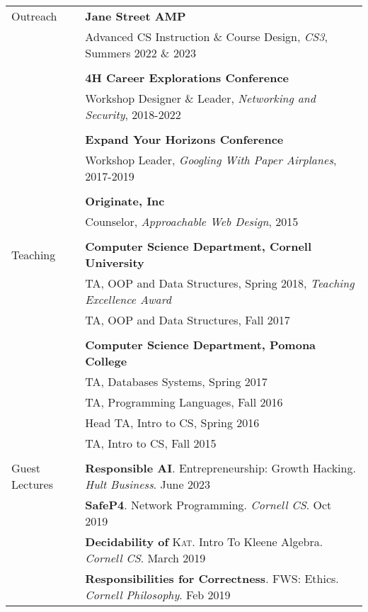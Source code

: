 \documentclass[letterpaper,10pt,oneside]{article}
\begin{document}
\begin{tabular}{@{} l l }
  \Large{Outreach}
  & \textbf{Jane Street AMP} \\
  & Advanced CS Instruction \& Course Design, \emph{CS3}, Summers 2022 \& 2023 \\
  \\
  & \textbf{4H Career Explorations Conference} \\
  & Workshop Designer \& Leader, \emph{Networking and Security}, 2018-2022 \\
  & \\
  & \textbf{Expand Your Horizons Conference} \\
  & Workshop Leader, \emph{Googling With Paper Airplanes}, 2017-2019 \\
  & \\
  & \textbf{Originate, Inc} \\
  & Counselor, \emph{Approachable Web Design}, 2015 \\
  & \\

  \Large{Teaching}
  & \textbf{Computer Science Department, Cornell University} \\
  
  & TA, OOP and Data Structures, Spring 2018, \textit{Teaching Excellence Award} \\
  & TA, OOP and Data Structures, Fall 2017 \\
  &\\
  
  & \textbf{Computer Science Department, Pomona College} \\
  & TA, Databases Systems, Spring 2017 \\
  & TA, Programming Languages, Fall 2016 \\
  & Head TA, Intro to CS, Spring 2016 \\
  & TA, Intro to CS, Fall 2015 \\
  &\\

  \Large{Guest Lectures}
  & \textbf{Responsible AI}. Entrepreneurship: Growth Hacking. \textit{Hult Business}. June 2023\\
  & \textbf{SafeP4}. Network Programming. \textit{Cornell CS}. Oct 2019 \\
  & \textbf{Decidability of }\textsc{Kat}. Intro To Kleene Algebra. \textit{Cornell CS}. March 2019 \\
  & \textbf{Responsibilities for Correctness}. FWS: Ethics. \textit{Cornell Philosophy}. Feb 2019\\

\end{tabular}
\end{document}
